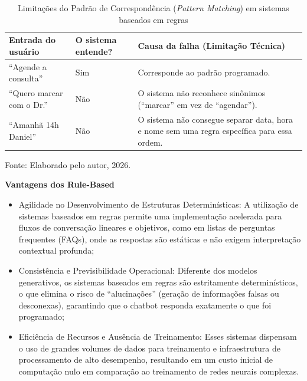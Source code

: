 \documentclass[12pt,a4paper]{extarticle}
\begin{document}
\begin{table}[h]
\centering
\caption{Limitações do Padrão de Correspondência (\textit{Pattern Matching}) em sistemas baseados em regras}
\label{tab:limitacoes-pattern-matching}
\begin{tabular}{p{2.8cm}p{2.2cm}p{7cm}}
\hline
\textbf{Entrada do usuário} & \textbf{O sistema entende?} & \textbf{Causa da falha (Limitação Técnica)} \\
\hline
``Agende a consulta'' & Sim & Corresponde ao padrão programado. \\
``Quero marcar com o Dr.'' & Não & O sistema não reconhece sinônimos (``marcar'' em vez de ``agendar''). \\
``Amanhã 14h Daniel'' & Não & O sistema não consegue separar data, hora e nome sem uma regra específica para essa ordem. \\
\hline
\end{tabular}
\vspace{0.3cm}

\footnotesize{Fonte: Elaborado pelo autor, 2026.}
\end{table}

\textbf{Vantagens dos Rule-Based}
\begin{itemize}
    \item Agilidade no Desenvolvimento de Estruturas Determinísticas: A utilização de sistemas baseados em regras permite uma implementação acelerada para fluxos de conversação lineares e objetivos, como em listas de perguntas frequentes (FAQs), onde as respostas são estáticas e não exigem interpretação contextual profunda;
    \item Consistência e Previsibilidade Operacional: Diferente dos modelos generativos, os sistemas baseados em regras são estritamente determinísticos, o que elimina o risco de ``alucinações'' (geração de informações falsas ou desconexas), garantindo que o chatbot responda exatamente o que foi programado;
    \item Eficiência de Recursos e Ausência de Treinamento: Esses sistemas dispensam o uso de grandes volumes de dados para treinamento e infraestrutura de processamento de alto desempenho, resultando em um custo inicial de computação nulo em comparação ao treinamento de redes neurais complexas.
\end{itemize}
\end{document}
